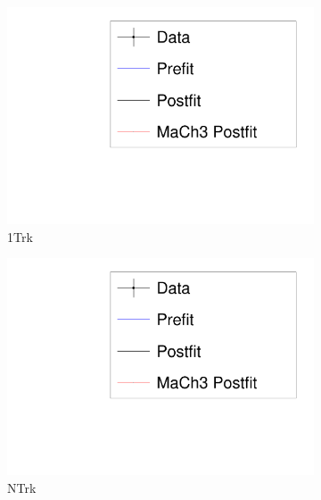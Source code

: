 \begin{figure}
	\begin{subfigure}[t]{0.24\textwidth}
		\includegraphics[width=\textwidth, trim={5mm 3mm 15mm 10mm}, clip, page=5]{figures/mach3/banff/mach3banff_mom}
		\caption{1Trk}
	\end{subfigure}
	\begin{subfigure}[t]{0.24\textwidth}
		\includegraphics[width=\textwidth, trim={5mm 3mm 15mm 10mm}, clip, page=6]{figures/mach3/banff/mach3banff_mom}
		\caption{NTrk}
	\end{subfigure}
	\begin{subfigure}[t]{0.24\textwidth}

\end{subfigure}
\end{figure}
